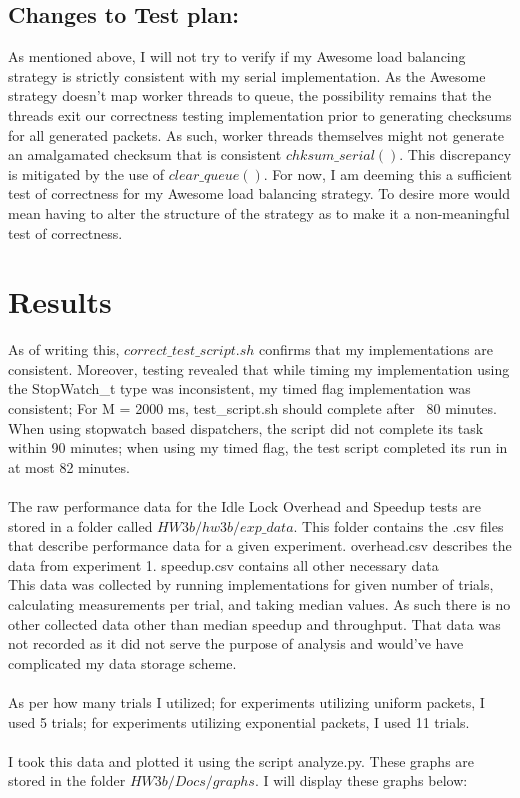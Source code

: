 \documentclass[]{article}
\begin{document}
\subsection{Changes to Test plan:}
As mentioned above, I will not try to verify if my Awesome load balancing strategy is strictly consistent with my serial implementation. As the Awesome strategy doesn't map worker threads to queue, the possibility remains that the threads exit our correctness testing implementation prior to generating checksums for all generated packets. As such, worker threads themselves might not generate an amalgamated checksum that is consistent $chksum\_serial()$. This discrepancy is mitigated by the use of $clear\_queue()$. For now, I am deeming this a sufficient test of correctness for my Awesome load balancing strategy. To desire more would mean having to alter the structure of the strategy as to make it a non-meaningful test of correctness.
\section{Results}
As of writing this, $correct\_test\_script.sh$ confirms that my implementations are consistent. Moreover, testing revealed that while timing my implementation using the StopWatch\_t type was inconsistent, my timed flag implementation was consistent; For M = 2000 ms, test\_script.sh should complete after ~80 minutes. When using stopwatch based dispatchers, the script did not complete its task within 90 minutes; when using my timed flag, the test script completed its run in at most 82 minutes.
\\\\
The raw performance data for the Idle Lock Overhead and Speedup tests are stored in a folder called $HW3b/hw3b/exp\_data$. This folder contains the .csv files that describe performance data for a given experiment. overhead.csv describes the data from experiment 1. speedup.csv contains all other necessary data
\\
This data was collected by running implementations for given number of trials, calculating measurements per trial, and taking median values. As such there is no other collected data other than median speedup and throughput. That data was not recorded as it did not serve the purpose of analysis and would've have complicated my data storage scheme.
\\\\
As per how many trials I utilized; for experiments utilizing uniform packets, I used 5 trials; for experiments utilizing exponential packets, I used 11 trials.
\\\\
I took this data and plotted it using the script analyze.py. These graphs are stored in the folder $HW3b/Docs/graphs$. I will display these graphs below:
\end{document}
